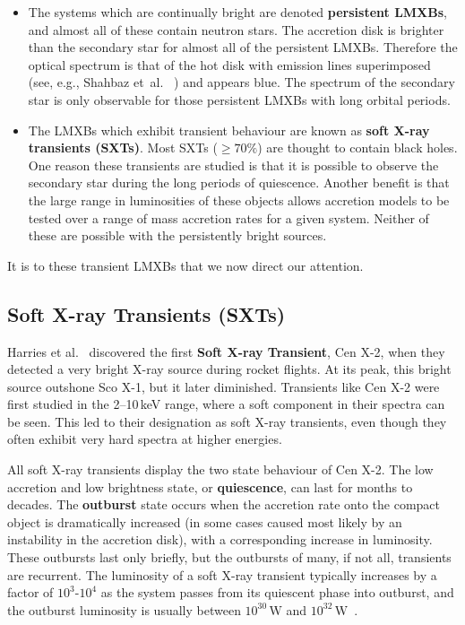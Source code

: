 \begin{itemize}
\item %
The systems which are continually bright are denoted
\textbf{persistent LMXBs}, and almost all of these contain neutron stars. %
The accretion disk is brighter than the secondary star for almost all of the persistent
LMXBs. Therefore the optical spectrum is that of the hot disk with emission lines superimposed (see, e.g., Shahbaz et~al.\ %
%
) and appears blue. The spectrum of the secondary star is only
observable for those persistent LMXBs with long orbital periods. %

\item %
The LMXBs which exhibit transient behaviour are known as \textbf{soft
X-ray transients (SXTs)}. Most SXTs ($\geq 70\%$) are thought to contain black holes.
One reason these transients are studied is that it is possible to observe the secondary star during the long periods of quiescence. Another benefit is that the large range in
luminosities of these objects allows accretion models to be tested
over a range of mass accretion rates for a given system. Neither of these are possible with the persistently bright sources. %


\end{itemize}
It is to these transient LMXBs that we now direct our attention. %



\subsection{Soft X-ray Transients (SXTs)}\label{cha:Introduction:sec:X-rayBinaries:subsec:SXTs}

Harries et al.\ %
\citeyear{Harries_et_al.:1967} %
discovered the first \textbf{Soft X-ray Transient}, %
Cen X-2, when they detected a very bright X-ray source %
during rocket flights. %
At its peak, this bright source outshone Sco X-1, but it later
diminished. Transients like Cen X-2 were first studied in the 2--10\,keV range, where a
soft component in their spectra can be seen. This led to their
designation as soft X-ray transients, even though they often exhibit
very hard spectra at higher energies. %

\vspace{\myparskip}

All soft X-ray transients display the two state behaviour of Cen X-2. The low
accretion and low brightness state, or
\textbf{quiescence}, can last for months to decades. The \textbf{outburst}
state occurs when the accretion rate onto the
compact object is dramatically increased (in some cases caused most
likely by an instability in the accretion disk), with a corresponding increase in luminosity.
These outbursts last only briefly, but the outbursts of many, if not all, transients are recurrent.
 The luminosity of a soft X-ray transient typically increases by a factor
of $10^3$-$10^4$ as the system passes from its quiescent phase into
outburst, and the outburst luminosity is usually between
$10^{30}\,\mathrm{W}$ and $10^{32}\,\mathrm{W}$~\cite{TanakaLewin:1995}. %


